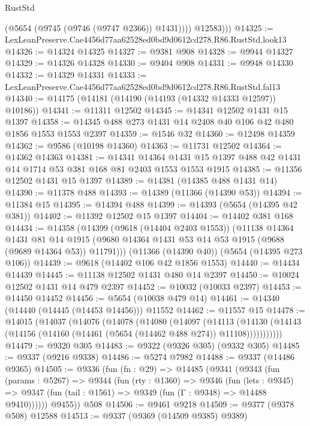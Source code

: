 \begin{lexlean}{RustStd}
\begin{coremodule}
              (@5654 (@9745 (@9746 (@9747 @2366)) @1431))))
          @12583)))
@14325 := LexLeanPreserve.Cae4456d77aa62528ed0bd9d0612cd278.R86.RustStd.look13
@14326 := @14324 @14325
@14327 := @9381 @908
@14328 := @9944 @14327
@14329 := @14326 @14328
@14330 := @9404 @908
@14331 := @9948 @14330
@14332 := @14329 @14331
@14333 := LexLeanPreserve.Cae4456d77aa62528ed0bd9d0612cd278.R86.RustStd.fal13
@14340 := @14175 (@14181 (@14190 (@14193 (@14332 @14333 @12597)) @10186))
@14341 := @11311 @12502
@14345 := @14341 @12502 @1431 @15 @1397
@14358 := @14345 @488 @273 @1431 @14 @2408 @40 @106 @42 @480 @1856 @1553 @1553 @2397
@14359 := @1546 @32
@14360 := @12498 @14359
@14362 := @9586 (@10198 @14360)
@14363 := @11731 @12502
@14364 := @14362 @14363
@14381 := @14341
    @14364
    @1431
    @15
    @1397
    @488
    @42
    @1431
    @14
    @1714
    @53
    @381
    @168
    @81
    @2403
    @1553
    @1553
    @1915
@14385 := @11356 @12502 @1431 @15 @1397
@14389 := @14381 (@14385 @488 @1431 @14)
@14390 := @11378 @488
@14393 := @14389 (@11366 (@14390 @53))
@14394 := @11384 @15
@14395 := @14394 @488
@14399 := @14393 (@5654 (@14395 @42 @381))
@14402 := @11392 @12502 @15 @1397
@14404 := @14402 @381 @168
@14434 := @14358
    (@14399
      (@9618 (@14404 @2403 @1553))
      (@11138
        @14364
        @1431
        @81
        @14
        @1915
        (@9680 @14364 @1431 @53 @14 @53 @1915 (@9688 (@9689 @14364 @53)) @11791)))
    (@11366 (@14390 @40))
    (@5654 (@14395 @273 @106))
@14439 := @9618 (@14402 @106 @42 @1856 @1553)
@14440 := @14434 @14439
@14445 := @11138 @12502 @1431 @480 @14 @2397
@14450 := @10024 @12502 @1431 @14 @479 @2397
@14452 := @10032 (@10033 @2397)
@14453 := @14450 @14452
@14456 := @5654 (@10038 @479 @14)
@14461 := @14340 (@14440 (@14445 (@14453 @14456))) @11552
@14462 := @11557 @15
@14478 := @14015
    (@14037
      (@14076
        (@14078
          (@14080
            (@14097
              (@14113
                (@14130 (@14143 (@14156 (@14160 (@14461 (@5654 (@14462 @488 @274)) @11108)))))))))))
@14479 := @9320 @305
@14483 := @9322 (@9326 @305) (@9332 @305)
@14485 := @9337 (@9216 @9338)
@14486 := @5274 @7982
@14488 := @9337 (@14486 @9365)
@14505 := @9336
    (fun (fn : @29) =>
    @14485
      (@9341
        (@9343
          (fun (params : @5267) =>
          @9344
            (fun (rty : @1360) =>
            @9346
              (fun (lets : @9345) =>
              @9347 (fun (tail : @1561) => @9349 (fun (Γ : @9348) => @14488 @9410))))))
        @9455))
    @508
@14506 := @9461 @9218
@14509 := @9377 (@9378 @508) @12588
@14513 := @9337 (@9369 (@14509 @9385) @9389)

\end{coremodule}
\end{lexlean}
